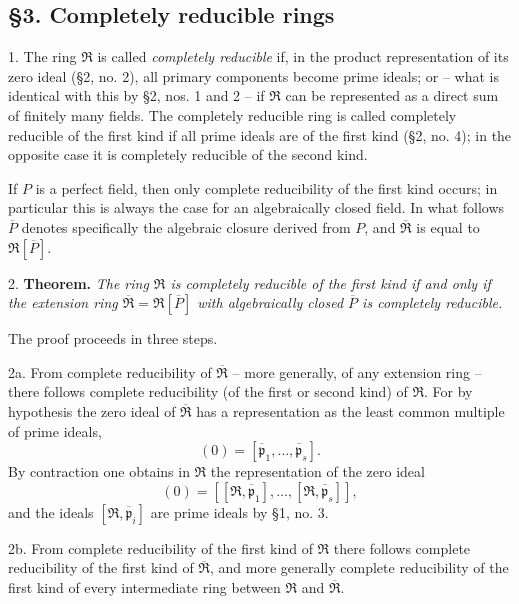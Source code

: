 \documentclass[11pt]{article}
\providecommand{\mR}{\mathfrak{R}}
\providecommand{\bR}{\overline{\mathfrak{R}}}
\providecommand{\bP}{\overline{P}}
\providecommand{\bp}{\overline{\mathfrak{p}}}
\begin{document}
\subsection*{§3. Completely reducible rings}

1. The ring $\mR$ is called \emph{completely reducible} if, in the product representation of its zero ideal (§2, no. 2), all primary components become prime ideals; or -- what is identical with this by §2, nos. 1 and 2 -- if $\mR$ can be represented as a direct sum of finitely many fields. The completely reducible ring is called completely reducible of the first kind if all prime ideals are of the first kind (§2, no. 4); in the opposite case it is completely reducible of the second kind.

If $P$ is a perfect field, then only complete reducibility of the first kind occurs; in particular this is always the case for an algebraically closed field. In what follows $\bP$ denotes specifically the algebraic closure derived from $P$, and $\bR$ is equal to $\mR[\bP]$.

2. \textbf{Theorem.} \emph{The ring $\mR$ is completely reducible of the first kind if and only if the extension ring $\bR=\mR[\bP]$ with algebraically closed $\bP$ is completely reducible.}

The proof proceeds in three steps.

2a. From complete reducibility of $\bR$ -- more generally, of any extension ring -- there follows complete reducibility (of the first or second kind) of $\mR$. For by hypothesis the zero ideal of $\bR$ has a representation as the least common multiple of prime ideals,
\[
        (0)=[\bp_1,\ldots,\bp_s].
\]
By contraction one obtains in $\mR$ the representation of the zero ideal
\[
        (0)=[[\mR,\bp_1],\ldots,[\mR,\bp_s]],
\]
and the ideals $[\mR,\bp_i]$ are prime ideals by §1, no. 3.

2b. From complete reducibility of the first kind of $\mR$ there follows complete reducibility of the first kind of $\bR$, and more generally complete reducibility of the first kind of every intermediate ring between $\mR$ and $\bR$.
\end{document}
